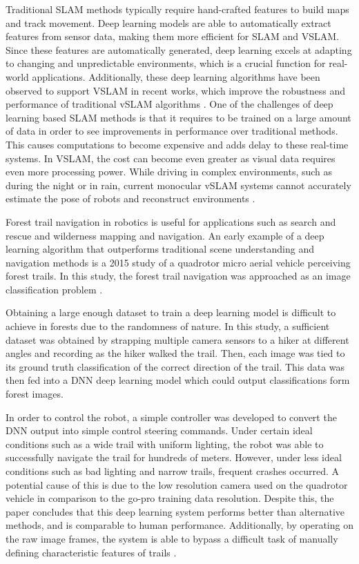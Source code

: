 \documentclass[conference]{IEEEtran}
\begin{document}
Traditional SLAM methods typically require hand-crafted features to build maps and track movement. Deep learning models are able to automatically extract features from sensor data, making them more efficient for SLAM and VSLAM. Since these features are automatically generated, deep learning excels at adapting to changing and unpredictable environments, which is a crucial function for real-world applications. Additionally, these deep learning algorithms have been observed to support VSLAM in recent works, which improve the robustness and performance of traditional vSLAM algorithms \cite{tang2022}. One of the challenges of deep learning based SLAM methods is that it requires to be trained on a large amount of data in order to see improvements in performance over traditional methods. This causes computations to become expensive and adds delay to these real-time systems. In VSLAM, the cost can become even greater as visual data requires even more processing power. While driving in complex environments, such as during the night or in rain, current monocular vSLAM systems cannot accurately estimate the pose of robots and reconstruct environments \cite{tang2022}.
\par 
Forest trail navigation in robotics is useful for applications such as search and rescue and wilderness mapping and navigation. An early example of a deep learning algorithm that outperforms traditional scene understanding and navigation methods is a 2015 study of a quadrotor micro aerial vehicle perceiving forest trails. In this study, the forest trail navigation was approached as an image classification problem \cite{giusti2015}.
\par
Obtaining a large enough dataset to train a deep learning model is difficult to achieve in forests due to the randomness of nature. In this study, a sufficient dataset was obtained by strapping multiple camera sensors to a hiker at different angles and recording as the hiker walked the trail. Then, each image was tied to its ground truth classification of the correct direction of the trail. This data was then fed into a DNN deep learning model which could output classifications form forest images. 
\par
In order to control the robot, a simple controller was developed to convert the DNN output into simple control steering commands. Under certain ideal conditions such as a wide trail with uniform lighting, the robot was able to successfully navigate the trail for hundreds of meters. However, under less ideal conditions such as bad lighting and narrow trails, frequent crashes occurred. A potential cause of this is due to the low resolution camera used on the quadrotor vehicle in comparison to the go-pro training data resolution. Despite this, the paper concludes that this deep learning system performs better than alternative methods, and is comparable to human performance. Additionally, by operating on the raw image frames, the system is able to bypass a difficult task of manually defining characteristic features of trails \cite{giusti2015}.
\end{document}
